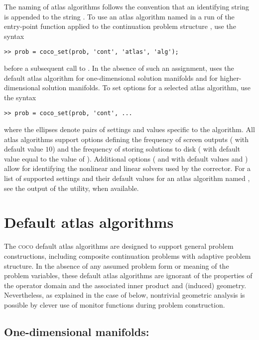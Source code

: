 The naming of atlas algorithms follows the convention that an identifying string is appended to the string . To use an atlas algorithm named  in a run of the  entry-point function applied to the continuation problem structure , use the syntax
\begin{lstlisting}[language=coco-highlight]
>> prob = coco_set(prob, 'cont', 'atlas', 'alg');
\end{lstlisting}
before a subsequent call to . In the absence of such an assignment,  uses the default atlas algorithm  for one-dimensional solution manifolds and  for higher-dimensional solution manifolds. To set options for a selected atlas algorithm, use the syntax
\begin{lstlisting}[language=coco-highlight]
>> prob = coco_set(prob, 'cont', ...
\end{lstlisting}
where the ellipses denote pairs of settings and values specific to the algorithm. All atlas algorithms support options defining the frequency of screen outputs ( with default value $10$) and the frequency of storing solutions to disk ( with default value equal to the value of ). Additional options ( and  with default values  and ) allow for identifying the nonlinear and linear solvers used by the corrector. For a list of supported settings and their default values for an atlas algorithm named , see the output of the  utility, when available.
 
\section{Default atlas algorithms}
The \textsc{coco} default atlas algorithms are designed to support general problem constructions, including composite continuation problems with adaptive problem structure. In the absence of any assumed problem form or meaning of the problem variables, these default atlas algorithms are ignorant of the properties of the operator domain and the associated inner product and (induced) geometry. Nevertheless, as explained in the case of  below, nontrivial geometric analysis is possible by clever use of monitor functions during problem construction.

\subsection{One-dimensional manifolds: }

